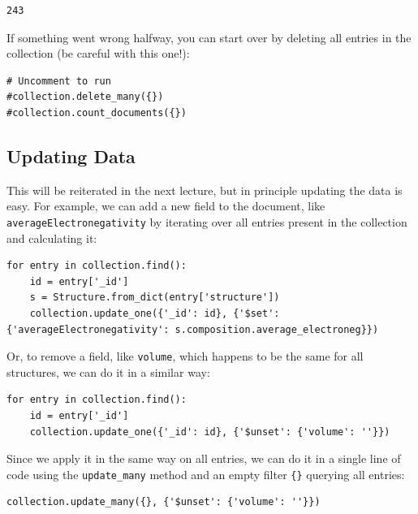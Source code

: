 \begin{verbatim}
243
\end{verbatim}

If something went wrong halfway, you can start over by deleting all
entries in the collection (be careful with this one!):

\begin{verbatim}
# Uncomment to run
#collection.delete_many({})
#collection.count_documents({})
\end{verbatim}

\hypertarget{updating-data}{%
\subsection{Updating Data}\label{pysipfenntutorial:updating-data}}

This will be reiterated in the next lecture, but in principle updating
the data is easy. For example, we can add a new field to the document,
like \texttt{averageElectronegativity} by iterating
over all entries present in the collection and calculating it:

\begin{verbatim}
for entry in collection.find():
    id = entry['_id']
    s = Structure.from_dict(entry['structure'])
    collection.update_one({'_id': id}, {'$set': {'averageElectronegativity': s.composition.average_electroneg}})
\end{verbatim}

Or, to remove a field, like \texttt{volume}, which
happens to be the same for all structures, we can do it in a similar
way:

\begin{verbatim}
for entry in collection.find():
    id = entry['_id']
    collection.update_one({'_id': id}, {'$unset': {'volume': ''}})
\end{verbatim}

Since we apply it in the same way on all entries, we can do it in a
single line of code using the \texttt{update\_many}
method and an empty filter \texttt{\{\}} querying all
entries:

\begin{verbatim}
collection.update_many({}, {'$unset': {'volume': ''}})
\end{verbatim}

